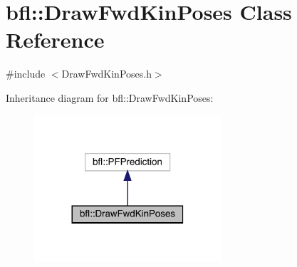 \hypertarget{classbfl_1_1DrawFwdKinPoses}{}\section{bfl\+:\+:Draw\+Fwd\+Kin\+Poses Class Reference}
\label{classbfl_1_1DrawFwdKinPoses}


{\ttfamily \#include $<$Draw\+Fwd\+Kin\+Poses.\+h$>$}



Inheritance diagram for bfl\+:\+:Draw\+Fwd\+Kin\+Poses\+:
\nopagebreak
\begin{figure}[H]
\begin{center}
\leavevmode
\includegraphics[width=197pt]{classbfl_1_1DrawFwdKinPoses__inherit__graph}
\end{center}
\end{figure}
